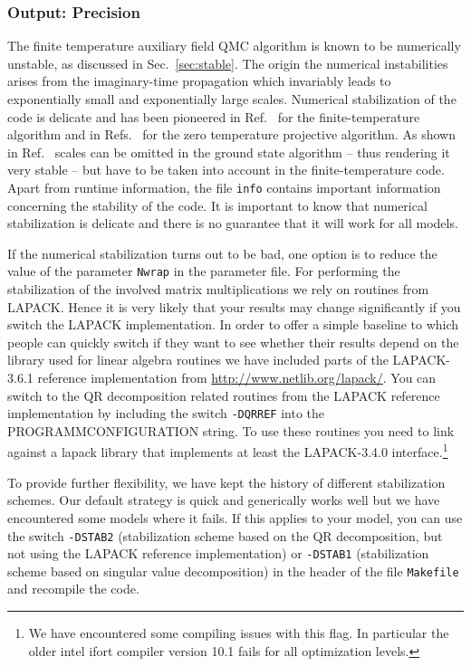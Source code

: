 \subsubsection{Output: Precision} \label{sec:output_prec}
%
The finite temperature  auxiliary field QMC algorithm is known to be numerically  unstable, as discussed in Sec.~\ref{sec:stable}.
The origin the numerical instabilities arises  from the imaginary-time propagation which invariably leads to exponentially small and exponentially large scales.
Numerical stabilization of the code is delicate and has been pioneered in Ref.~\cite{White89}  for the finite-temperature algorithm and in Refs.~\cite{Sugiyama86,Sorella89} for the zero temperature projective algorithm.
As shown in Ref.~\cite{Assaad08_rev}  scales can be omitted in the ground state algorithm -- thus rendering it very stable --  but have to be taken into account in the  finite-temperature code. Apart from runtime information, the file \texttt{info} contains important information concerning the stability of the code.
It is important to know that numerical stabilization is delicate and there is no guarantee  that it will work for all models.




If the numerical stabilization turns out to be bad, one option is to reduce the  value of the parameter \texttt{Nwrap} in the parameter file. 
For performing the stabilization of the involved matrix multiplications we rely on routines from LAPACK. Hence it is very likely that your results may change significantly if you switch the LAPACK implementation.
In order to offer a simple baseline to which people can quickly switch if they want to see whether their results depend on the library used for linear algebra routines we have included parts of the LAPACK-3.6.1 reference implementation from
\url{http://www.netlib.org/lapack/}. You can switch to the QR decomposition related routines from the LAPACK reference implementation by including the switch \texttt{-DQRREF} into the PROGRAMMCONFIGURATION string.
To use these routines you need to link against a lapack library that implements at least the LAPACK-3.4.0 interface.\footnote{ We have encountered some compiling issues with this flag. In particular  the  older  intel  ifort  compiler version 10.1  fails for all optimization levels.}

To provide further flexibility, we have  kept the history of different stabilization schemes.   Our default strategy is quick and generically works well but we have  encountered some  models where  it  fails.   If this applies to your model, you can use the switch 
\texttt{-DSTAB2} (stabilization scheme based on the QR decomposition, but not using the LAPACK reference implementation) or  
\texttt{-DSTAB1} (stabilization scheme based on singular value decomposition)   in the header of the file \texttt{Makefile} and recompile the code.  

